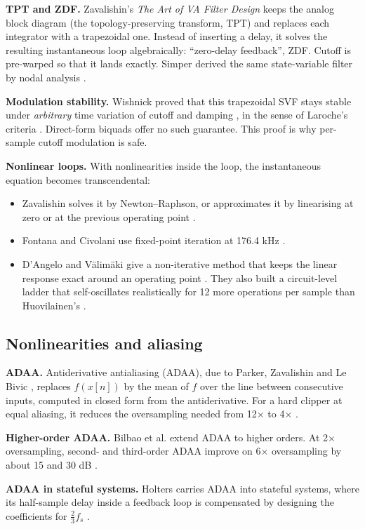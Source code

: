 \documentclass[conference]{IEEEtran}
\begin{document}
\textbf{TPT and ZDF.} Zavalishin's \emph{The Art of VA Filter Design} \cite{r42} keeps the analog block diagram (the topology-preserving transform, TPT) and replaces each integrator with a trapezoidal one. Instead of inserting a delay, it solves the resulting instantaneous loop algebraically: ``zero-delay feedback'', ZDF. Cutoff is pre-warped so that it lands exactly. Simper derived the same state-variable filter by nodal analysis \cite{r30}.

\textbf{Modulation stability.} Wishnick proved that this trapezoidal SVF stays stable under \emph{arbitrary} time variation of cutoff and damping \cite{r41}, in the sense of Laroche's criteria \cite{r21}. Direct-form biquads offer no such guarantee. This proof is why per-sample cutoff modulation is safe.

\textbf{Nonlinear loops.} With nonlinearities inside the loop, the instantaneous equation becomes transcendental:

\begin{itemize}
\item Zavalishin solves it by Newton–Raphson, or approximates it by linearising at zero or at the previous operating point \cite{r42}.
\item Fontana and Civolani use fixed-point iteration at 176.4 kHz \cite{r12}.
\item D'Angelo and Välimäki give a non-iterative method that keeps the linear response exact around an operating point \cite{r7}. They also built a circuit-level ladder that self-oscillates realistically for 12 more operations per sample than Huovilainen's \cite{r5}.
\end{itemize}

\setcounter{subsection}{6}
\subsection{Nonlinearities and aliasing}
\textbf{ADAA.} Antiderivative antialiasing (ADAA), due to Parker, Zavalishin and Le Bivic \cite{r25}, replaces $f(x[n])$ by the mean of $f$ over the line between consecutive inputs, computed in closed form from the antiderivative. For a hard clipper at equal aliasing, it reduces the oversampling needed from 12× to 4× \cite{r25}.

\textbf{Higher-order ADAA.} Bilbao et al. extend ADAA to higher orders. At 2× oversampling, second- and third-order ADAA improve on 6× oversampling by about 15 and 30 dB \cite{r3}.

\textbf{ADAA in stateful systems.} Holters carries ADAA into stateful systems, where its half-sample delay inside a feedback loop is compensated by designing the coefficients for $\tfrac{2}{3} f_s$ \cite{r16}.
\end{document}
